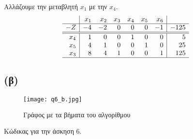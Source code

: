 \documentclass[12pt]{report}
\begin{document}
Αλλάζουμε την μεταβλητή $x_1$ με την $x_4$.
$$
    \begin{array}{r|rrrrrr|r}
            & x_1 & x_2 & x_3 & x_4 & x_5 & x_6 &      \\ \hline
        -Z  & -4  & -2  & 0   & 0   & 0   & -1  & -125 \\ \hline\hline
        x_4 & 1   & 0   & 0   & 1   & 0   & 0   & 5    \\
        x_5 & 4   & 1   & 0   & 0   & 1   & 0   & 25   \\
        x_3 & 8   & 4   & 1   & 0   & 0   & 1   & 125  \\ \hline
    \end{array}
$$
\subsection*{(β)}
\begin{figure}[h]
    \texttt{[image: q6\_b.jpg]}
    \caption{Γράφος με τα βήματα του αλγορίθμου}
    \label{fig:q6_b}
\end{figure}
\clearpage
Κώδικας για την άσκηση 6.

\end{document}
